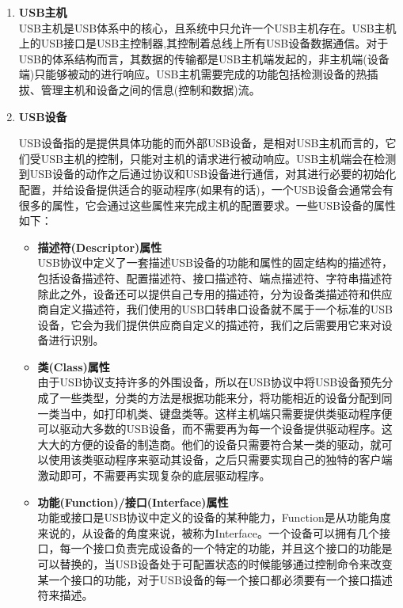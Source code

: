 \begin{enumerate}
\item \textbf{USB主机}\\
	USB主机是USB体系中的核心，且系统中只允许一个USB主机存在。USB主机上的USB接口是USB主控制器,其控制着总线上所有USB设备数据通信。对于USB的体系结构而言，其数据的传输都是USB主机端发起的，非主机端(设备端)只能够被动的进行响应。USB主机需要完成的功能包括检测设备的热插拔、管理主机和设备之间的信息(控制和数据)流\cite{李雪红2004USB}\cite{莫宏伟2001USB}。



\item \textbf{USB设备}

	USB设备指的是提供具体功能的而外部USB设备，是相对USB主机而言的，它们受USB主机的控制，只能对主机的请求进行被动响应。USB主机端会在检测到USB设备的动作之后通过协议和USB设备进行通信，对其进行必要的初始化配置，并给设备提供适合的驱动程序(如果有的话)，一个USB设备会通常会有很多的属性，它会通过这些属性来完成主机的配置要求。一些USB设备的属性如下：
	\begin{itemize}
	\item \textbf{描述符(Descriptor)属性}\\
	USB协议中定义了一套描述USB设备的功能和属性的固定结构的描述符，包括设备描述符、配置描述符、接口描述符、端点描述符、字符串描述符\cite{张杰2008基于}\cite{边海龙2004USB}除此之外，设备还可以提供自己专用的描述符，分为设备类描述符和供应商自定义描述符，我们使用的USB口转串口设备就不属于一个标准的USB设备，它会为我们提供供应商自定义的描述符，我们之后需要用它来对设备进行识别。
	
	\item \textbf{类(Class)属性}\\
	由于USB协议支持许多的外围设备，所以在USB协议中将USB设备预先分成了一些类型，分类的方法是根据功能来分，将功能相近的设备分配到同一类当中，如打印机类、键盘类等。这样主机端只需要提供类驱动程序便可以驱动大多数的USB设备，而不需要再为每一个设备提供驱动程序。这大大的方便的设备的制造商。他们的设备只需要符合某一类的驱动，就可以使用该类驱动程序来驱动其设备，之后只需要实现自己的独特的客户端激动即可，不需要再实现复杂的底层驱动程序\cite{李雪红2004USB}。	
	
	\item \textbf{功能(Function)/接口(Interface)属性}\\
	功能或接口是USB协议中定义的设备的某种能力，Function是从功能角度来说的，从设备的角度来说，被称为Interface。一个设备可以拥有几个接口，每一个接口负责完成设备的一个特定的功能，并且这个接口的功能是可以替换的，当USB设备处于可配置状态的时候能够通过控制命令来改变某一个接口的功能，对于USB设备的每一个接口都必须要有一个接口描述符来描述。
	

\end{itemize}
\end{enumerate}
